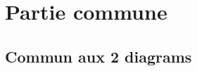 \documentclass{article}
\begin{document}




\newpage

\tableofcontents

\newpage

\section{Partie commune}
\subsection{Commun aux 2 diagrams}
\end{document}
